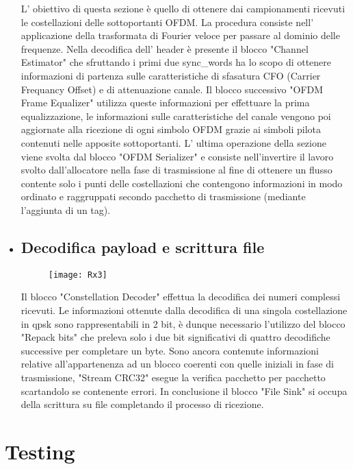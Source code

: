 \begin{itemize}
 	L' obiettivo di questa sezione è quello di ottenere dai campionamenti ricevuti le costellazioni delle sottoportanti OFDM. La procedura consiste nell' applicazione della trasformata di Fourier veloce per passare al dominio delle frequenze. Nella decodifica dell' header è presente il blocco "Channel Estimator" che sfruttando i primi due sync\_words ha lo scopo di ottenere informazioni di partenza sulle caratteristiche di sfasatura CFO (Carrier Frequancy Offset) e di attenuazione canale. Il blocco successivo "OFDM Frame Equalizer" utilizza queste informazioni per effettuare la prima equalizzazione, le informazioni sulle caratteristiche del canale vengono poi aggiornate alla ricezione di ogni simbolo OFDM grazie ai simboli pilota contenuti nelle apposite sottoportanti. L' ultima operazione della sezione viene svolta dal blocco "OFDM Serializer" e consiste nell'invertire il lavoro svolto dall'allocatore nella fase di trasmissione al fine di ottenere un flusso contente solo i punti delle costellazioni che contengono informazioni in modo ordinato e raggruppati secondo pacchetto di trasmissione (mediante l'aggiunta di un tag). 
 	
 	\item \subsection{Decodifica payload e scrittura file}
 	\begin{figure}[h]
 		\centering
 		\texttt{[image: Rx3]}
 		\caption{}
 	\end{figure}
 	Il blocco "Constellation Decoder" effettua la decodifica dei numeri complessi ricevuti. Le informazioni ottenute dalla decodifica di una singola costellazione in qpsk sono rappresentabili in 2 bit, è dunque necessario l'utilizzo del blocco "Repack bits" che preleva solo i due bit significativi di quattro decodifiche successive per completare un byte. Sono ancora contenute informazioni relative all'appartenenza ad un blocco coerenti con quelle iniziali in fase di trasmissione, "Stream CRC32" esegue la verifica pacchetto per pacchetto scartandolo se contenente errori. In conclusione il blocco "File Sink" si occupa della scrittura su file completando il processo di ricezione.
 \end{itemize}
\section{Testing}
